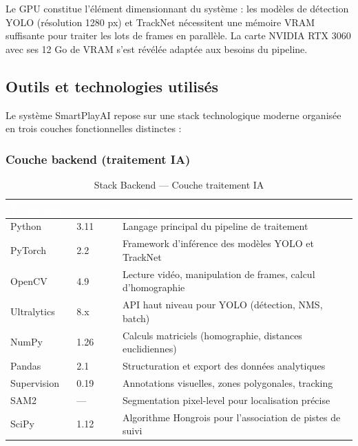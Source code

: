Le GPU constitue l'élément dimensionnant du système : les modèles de détection YOLO (résolution
1280 px) et TrackNet nécessitent une mémoire VRAM suffisante pour traiter les lots de frames en
parallèle. La carte NVIDIA RTX 3060 avec ses 12 Go de VRAM s'est révélée adaptée aux besoins
du pipeline.
 
\subsection{Outils et technologies utilisés}
 
Le système SmartPlayAI repose sur une stack technologique moderne organisée en trois couches
fonctionnelles distinctes :
 
\subsubsection*{Couche backend (traitement IA)}
 
\begin{table}[H]
  \centering
  \tablestyle
  \begin{tabularx}{\textwidth}{L{2.8cm} C{2cm} X}
    \toprule
    \textcolor{white}{\textbf{Technologie}} & \textcolor{white}{\textbf{Version}} & \textcolor{white}{\textbf{Usage}} \\
    \midrule
    Python & 3.11 & Langage principal du pipeline de traitement \\
    PyTorch & 2.2 & Framework d'inférence des modèles YOLO et TrackNet \\
    OpenCV & 4.9 & Lecture vidéo, manipulation de frames, calcul d'homographie \\
    Ultralytics & 8.x & API haut niveau pour YOLO (détection, NMS, batch) \\
    NumPy & 1.26 & Calculs matriciels (homographie, distances euclidiennes) \\
    Pandas & 2.1 & Structuration et export des données analytiques \\
    Supervision & 0.19 & Annotations visuelles, zones polygonales, tracking \\
    SAM2 & — & Segmentation pixel-level pour localisation précise \\
    SciPy & 1.12 & Algorithme Hongrois pour l'association de pistes de suivi \\
    \bottomrule
  \end{tabularx}
  \caption{Stack Backend — Couche traitement IA}
  \label{tab:stack_backend}
\end{table}
 
